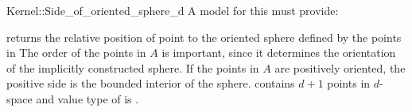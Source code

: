 \begin{ccRefFunctionObjectConcept}{Kernel::Side_of_oriented_sphere_d}
A model for this must provide:


{returns the relative position of point  to the oriented
 sphere defined by the points in \ccc{A = tuple [first,last)} The
 order of the points in $A$ is important, since it determines the
 orientation of the implicitly constructed sphere.  If the points in
 $A$ are positively oriented, the positive side is the bounded 
 interior of the sphere.  
 \ccPrecond {} contains $d+1$ points in $d$-space and
 value type of  is .}

\end{ccRefFunctionObjectConcept}
